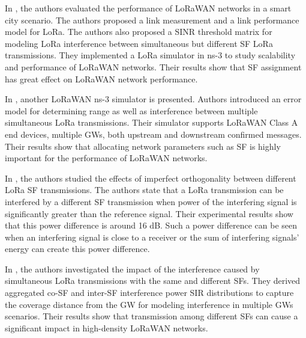 \documentclass[conference]{IEEEtran}
\begin{document}
\par In \cite{7996384}, the authors evaluated the performance of LoRaWAN networks in a smart city scenario. The authors proposed a link measurement and a link performance model for LoRa. The authors also proposed a SINR threshold matrix for modeling LoRa interference between simultaneous but different SF LoRa transmissions. They implemented a LoRa simulator in ns-3 to study scalability and performance of LoRaWAN networks. Their results show that SF assignment has great effect on LoRaWAN network performance.

\par In \cite{8090518}, another LoRaWAN ns-3 simulator is presented. Authors introduced an error model for determining range as well as interference between multiple simultaneous LoRa transmissions. Their simulator supports LoRaWAN Class A end devices, multiple GWs, both upstream and downstream confirmed messages. Their results show that allocating network parameters such as SF is highly important for the performance of LoRaWAN networks.

\par In \cite{8267219}, the authors studied the effects of imperfect orthogonality between different LoRa SF transmissions. The authors state that a LoRa transmission can be interfered by a different SF transmission when power of the interfering signal is significantly greater than the reference signal. Their experimental results show that this power difference is around 16 dB. Such a power difference can be seen when an interfering signal is close to a receiver or the sum of interfering signals' energy can create this power difference.

\par In \cite{8430542}, the authors investigated the impact of the interference caused by simultaneous LoRa transmissions with the same and different SFs. They derived aggregated co-SF and inter-SF interference power SIR distributions to capture the coverage distance from the GW for modeling interference in multiple GWs scenarios. Their results show that transmission among different SFs can cause a significant impact in high-density LoRaWAN networks.
\end{document}
